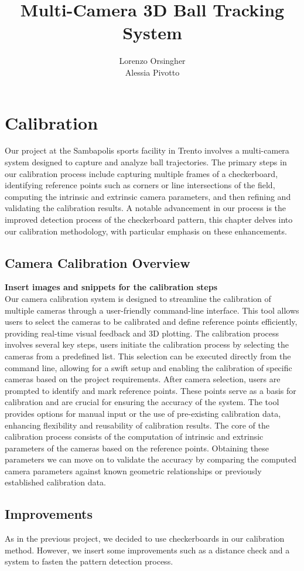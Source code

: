 \documentclass{template}
\title{Multi-Camera 3D Ball Tracking System}
\author{Lorenzo Orsingher\\Alessia Pivotto}
\begin{document}
\chapter{Calibration}\label{ch:in}
Our project at the Sambapolis sports facility in Trento involves a multi-camera system designed to capture and analyze ball trajectories. 
The primary steps in our calibration process include capturing multiple frames of a checkerboard, identifying reference points such as corners or line intersections of the field, computing the intrinsic and extrinsic camera parameters, and then refining and validating the calibration results.
A notable advancement in our process is the improved detection process of the checkerboard pattern, this chapter delves into our calibration methodology, with particular emphasis on these enhancements.

\section{Camera Calibration Overview}
\textbf{Insert images and snippets for the calibration steps}\\
Our camera calibration system is designed to streamline the calibration of multiple cameras through a user-friendly command-line interface. 
This tool allows users to select the cameras to be calibrated and define reference points efficiently, providing real-time visual feedback and 3D plotting. 
The calibration process involves several key steps, users initiate the calibration process by selecting the cameras from a predefined list. 
This selection can be executed directly from the command line, allowing for a swift setup and enabling the calibration of specific cameras based on the project requirements. 
After camera selection, users are prompted to identify and mark reference points. 
These points serve as a basis for calibration and are crucial for ensuring the accuracy of the system. 
The tool provides options for manual input or the use of pre-existing calibration data, enhancing flexibility and reusability of calibration results.
The core of the calibration process consists of the computation of intrinsic and extrinsic parameters of the cameras based on the reference points. 
Obtaining these parameters we can move on to validate the accuracy by comparing the computed camera parameters against known geometric relationships or previously established calibration data. 

\section{Improvements}
As in the previous project, we decided to use checkerboards in our calibration method. 
However, we insert some improvements such as a distance check and a system to fasten the pattern detection process.
\end{document}
